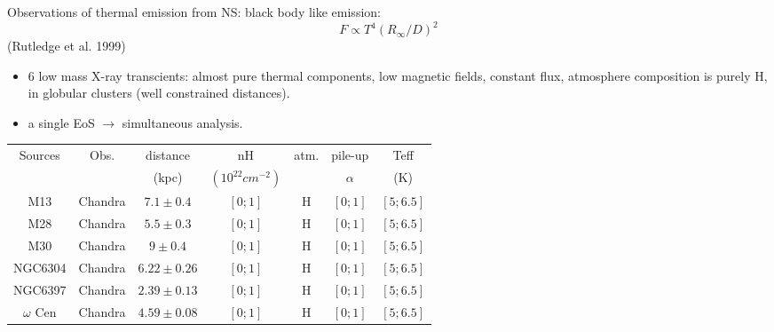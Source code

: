 \documentclass[francais]{beamer}
\begin{document}
\begin{frame}{Observations of thermal emission from NS:}
black body like emission:
$$F \propto T^4(R_{\infty}/D)^2$$ ({\small Rutledge et al. 1999})
\begin{itemize}
\color{white}
	\item 6 low mass X-ray transcients: almost pure thermal components, low magnetic fields, constant flux, atmosphere composition is purely H, in globular clusters (well constrained distances).
	\item a single EoS $\rightarrow$ simultaneous analysis.
\end{itemize}


\begin{table}
{\small
\begin{tabular}{ccccccc}
\hline Sources & Obs. & distance & nH & atm. & pile-up & Teff \\
  &  & (kpc) & $(10^{22}cm^{-2})$ & & $\alpha$ & (K) \\
\hline M13 & Chandra & $7.1 \pm 0.4$ & $[0;1]$ & H & $[0;1]$ & $[5;6.5]$ \\
 M28 & Chandra & $5.5 \pm 0.3$ & $[0;1]$ & H & $[0;1]$ & $[5;6.5]$ \\
 M30 & Chandra & $9 \pm 0.4$ & $[0;1]$ & H & $[0;1]$ & $[5;6.5]$ \\
 NGC6304 & Chandra & $6.22 \pm 0.26$ & $[0;1]$ & H & $[0;1]$ & $[5;6.5]$ \\
 NGC6397 & Chandra & $2.39 \pm 0.13$ & $[0;1]$ & H & $[0;1]$ & $[5;6.5]$ \\
 $\omega$ Cen & Chandra & $4.59 \pm 0.08$ & $[0;1]$ & H & $[0;1]$ & $[5;6.5]$ \\
\hline
\end{tabular}
}
\end{table}
\end{frame}
\end{document}

